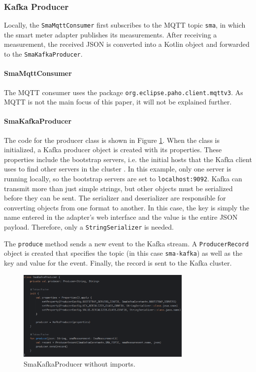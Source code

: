\subsubsection{Kafka Producer}

Locally, the \lstinline{SmaMqttConsumer} first subscribes to the MQTT topic \lstinline{sma}, in which the smart meter adapter publishes its measurements. After receiving a measurement, the received JSON is converted into a Kotlin object and forwarded to the \lstinline{SmaKafkaProducer}.

\paragraph{SmaMqttConsumer}

The MQTT consumer uses the package \lstinline{org.eclipse.paho.client.mqttv3}. As MQTT is not the main focus of this paper, it will not be explained further.

\paragraph{SmaKafkaProducer}

The code for the producer class is shown in Figure \ref{fig:producer}. When the class is initialized, a Kafka producer object is created with its properties. These properties include the bootstrap servers, i.e. the initial hosts that the Kafka client uses to find other servers in the cluster \cite{kafkaDoc}. In this example, only one server is running locally, so the bootstrap servers are set to \lstinline{localhost:9092}. Kafka can transmit more than just simple strings, but other objects must be serialized before they can be sent. The serializer and deserializer are responsible for converting objects from one format to another. In this case, the key is simply the name entered in the adapter's web interface and the value is the entire JSON payload. Therefore, only a \lstinline{StringSerializer} is needed.

The \lstinline{produce} method sends a new event to the Kafka stream. A \lstinline{ProducerRecord} object is created that specifies the topic (in this case \lstinline{sma-kafka}) as well as the key and value for the event. Finally, the record is sent to the Kafka cluster.

\begin{figure}[ht]
    \centering
    \includegraphics[width=8.5cm]{images/producer.png}
    \caption{SmaKafkaProducer without imports.}
    \label{fig:producer}
\end{figure}

